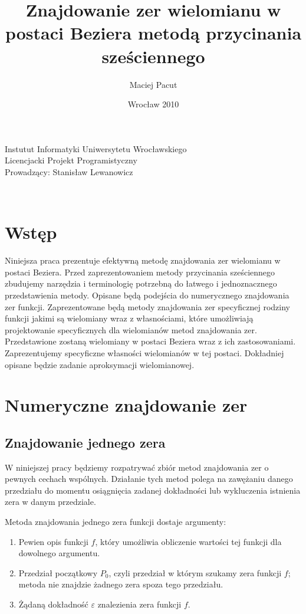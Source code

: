 \documentclass{article}
\title{Znajdowanie zer wielomianu w postaci Beziera metodą przycinania sześciennego}
\author{Maciej Pacut}
\date{Wrocław 2010}
\makeatletter
\renewcommand{\maketitle}{\begin{titlepage}
    \vspace*{1cm}
    \begin{center}
      Instutut Informatyki Uniwersytetu Wrocławskiego\\
      Licencjacki Projekt Programistyczny \\
      Prowadzący: Stanisław Lewanowicz \\
      \vspace{3cm}
      \normalsize \@author \par
      \vspace{0.8cm}
      \noindent
      \LARGE \textsc{\@title}\\
      \vspace{1cm}
      \normalsize
    \end{center}
    \vspace{0.5cm}
    \begin{flushright}
      \vspace{5cm}
    \end{flushright}
    \vspace*{\stretch{6}}
    \begin{center}
      \@date
    \end{center}
  \end{titlepage}%
}
\makeatother
\begin{document}
\maketitle
\newpage

\section{Wstęp}

Niniejsza praca prezentuje efektywną metodę znajdowania zer wielomianu w postaci Beziera. Przed zaprezentowaniem metody przycinania sześciennego zbudujemy narzędzia i terminologię potrzebną do łatwego i jednoznacznego przedstawienia metody. Opisane będą podejścia do numerycznego znajdowania zer funkcji. Zaprezentowane będą metody znajdowania zer specyficznej rodziny funkcji jakimi są wielomiany wraz z własnościami, które umożliwiają projektowanie specyficznych dla wielomianów metod znajdowania zer. Przedstawione zostaną wielomiany w postaci Beziera wraz z ich zastosowaniami. Zaprezentujemy specyficzne własności wielomianów w tej postaci. Dokładniej opisane będzie zadanie aproksymacji wielomianowej.

\section{Numeryczne znajdowanie zer}

\subsection{Znajdowanie jednego zera}

W niniejszej pracy będziemy rozpatrywać zbiór metod znajdowania zer o pewnych cechach wspólnych. Działanie tych metod polega na zawężaniu danego przedziału do momentu osiągnięcia zadanej dokładności lub wykluczenia istnienia zera w danym przedziale.

Metoda znajdowania jednego zera funkcji dostaje argumenty:
\begin{enumerate}
\item Pewien opis funkcji $f$, który umożliwia obliczenie wartości tej funkcji dla dowolnego argumentu.
\item Przedział początkowy $P_0$, czyli przedział w którym szukamy zera funkcji $f$; metoda nie znajdzie żadnego zera spoza tego przedziału.
\item Żądaną dokładność $\varepsilon$ znalezienia zera funkcji $f$.
\end{enumerate}
\end{document}
